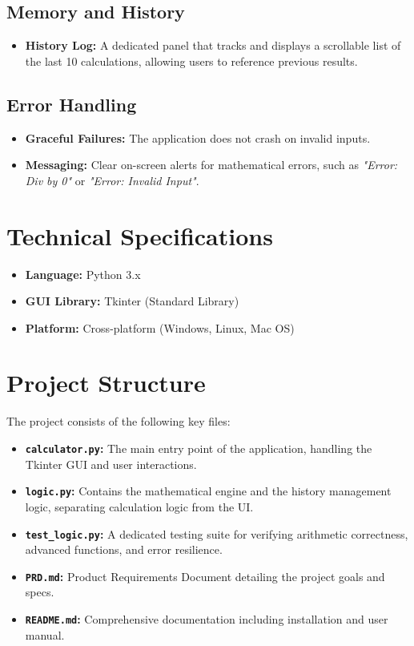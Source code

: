 \documentclass[12pt, a4paper]{article}
\begin{document}
\subsection{Memory and History}
\begin{itemize}
    \item \textbf{History Log:} A dedicated panel that tracks and displays a scrollable list of the last 10 calculations, allowing users to reference previous results.
\end{itemize}

\subsection{Error Handling}
\begin{itemize}
    \item \textbf{Graceful Failures:} The application does not crash on invalid inputs.
    \item \textbf{Messaging:} Clear on-screen alerts for mathematical errors, such as \textit{"Error: Div by 0"} or \textit{"Error: Invalid Input"}.
\end{itemize}

\section{Technical Specifications}
\begin{itemize}
    \item \textbf{Language:} Python 3.x
    \item \textbf{GUI Library:} Tkinter (Standard Library)
    \item \textbf{Platform:} Cross-platform (Windows, Linux, Mac OS)
\end{itemize}

\section{Project Structure}
The project consists of the following key files:
\begin{itemize}
    \item \textbf{\texttt{calculator.py}:} The main entry point of the application, handling the Tkinter GUI and user interactions.
    \item \textbf{\texttt{logic.py}:} Contains the mathematical engine and the history management logic, separating calculation logic from the UI.
    \item \textbf{\texttt{test\_logic.py}:} A dedicated testing suite for verifying arithmetic correctness, advanced functions, and error resilience.
    \item \textbf{\texttt{PRD.md}:} Product Requirements Document detailing the project goals and specs.
    \item \textbf{\texttt{README.md}:} Comprehensive documentation including installation and user manual.
\end{itemize}
\end{document}
